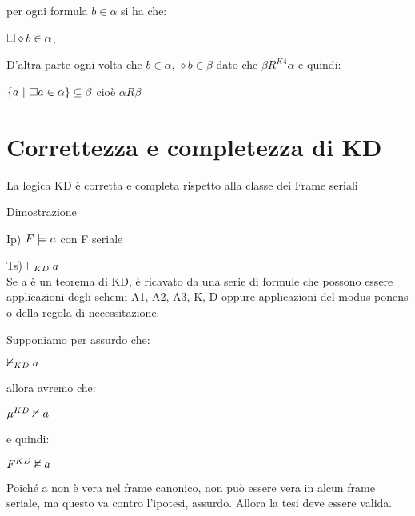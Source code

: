 per ogni formula $b\in\alpha$ si ha che:

$\square\diamond b\in\alpha$,

D'altra parte ogni volta che $b\in\alpha$, $\diamond b\in\beta$
dato che $\beta R^{K4}\alpha$ e quindi:

$\{a\ |\ \square a\in\alpha\}\subseteq\beta$ cioè $\alpha R\beta$


\section{Correttezza e completezza di KD}

La logica KD è corretta e completa rispetto alla classe dei Frame
seriali

Dimostrazione

Ip) $F\models a$ con F seriale

Ts) $\vdash_{KD}a$\\


Se a è un teorema di KD, è ricavato da una serie di formule che possono
essere applicazioni degli schemi A1, A2, A3, K, D oppure applicazioni
del modus ponens o della regola di necessitazione.

Supponiamo per assurdo che:

$\nvdash_{KD}a$

allora avremo che:

$\mu^{KD}\nvDash a$

e quindi:

$F^{KD}\nvDash a$

Poiché a non è vera nel frame canonico, non può essere vera in alcun
frame seriale, ma questo va contro l'ipotesi, assurdo. Allora la tesi
deve essere valida.

